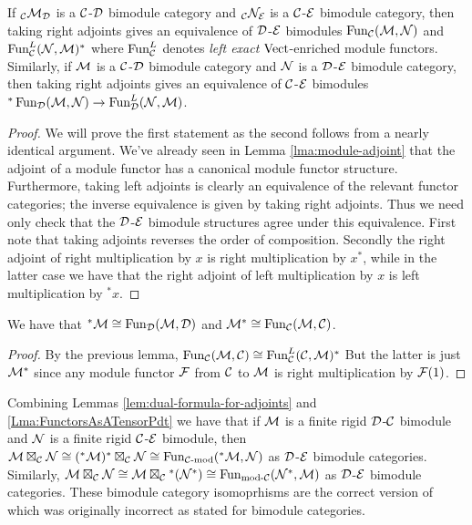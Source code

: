 \documentclass{amsart}
\begin{document}
\begin{lemma}
If ${}_{\mathcal C}\mathcal M_\mathcal D$ is a $\mathcal C$-$\mathcal D$ bimodule category and ${}_{\mathcal C}\mathcal N_\mathcal E$ is a $\mathcal C$-$\mathcal E$ bimodule category, then taking right adjoints gives an equivalence of $\mathcal D$-$\mathcal E$ bimodules $\operatorname{Fun}_{\mathcal C}(\mathcal M, \mathcal N)$ and $\operatorname{Fun}^L_{\mathcal C}(\mathcal N, \mathcal M)^*$ where $\operatorname{Fun}^L_\mathcal C$ denotes {\em left exact} $\mathrm{Vect}$-enriched module functors.  Similarly, if $\mathcal M$ is a $\mathcal C$-$\mathcal D$ bimodule category and $\mathcal N$ is a $\mathcal D$-$\mathcal E$ bimodule category, then taking right adjoints gives an equivalence of $\mathcal C$-$\mathcal E$ bimodules ${}^*\operatorname{Fun}_{\mathcal D}(\mathcal M, \mathcal N) \rightarrow \operatorname{Fun}^L_{\mathcal D}(\mathcal N, \mathcal M)$. 
\end{lemma}
\begin{proof}
	We will prove the first statement as the second follows from a nearly identical argument. 
We've already seen in Lemma \ref{lma:module-adjoint} that the adjoint of a module functor has a canonical module functor structure.  Furthermore, taking left adjoints is clearly an equivalence of the relevant functor categories; the inverse equivalence is given by taking right adjoints. Thus we need only check that the $\mathcal D$-$\mathcal E$ bimodule structures agree under this equivalence.  First note that taking adjoints reverses the order of composition. Secondly the right adjoint of right multiplication by $x$ is right multiplication by $x^*$, while in the latter case we have that the right adjoint of left multiplication by $x$ is left multiplication by ${}^*x$.
\end{proof}

\begin{lemma} \label{lem:dual-formula-for-adjoints}
We have that ${}^*\mathcal M \cong \operatorname{Fun}_{\mathcal D}(\mathcal M, \mathcal D)$ and $\mathcal M^* \cong \operatorname{Fun}_{\mathcal C}(\mathcal M, \mathcal C)$.
\end{lemma}
\begin{proof}
By the previous lemma, $\operatorname{Fun}_{\mathcal C}(\mathcal M, \mathcal C) \cong \operatorname{Fun}_{\mathcal C}^L(\mathcal C, \mathcal M)^*$  But the latter is just $\mathcal M^*$ since any module functor $\mathcal F$ from $\mathcal C$ to $\mathcal M$ is right multiplication by $\mathcal F(1)$.
\end{proof}

\begin{remark}
Combining Lemmas \ref{lem:dual-formula-for-adjoints} and \ref{Lma:FunctorsAsATensorPdt} we have that if $\mathcal M$ is a finite rigid $\mathcal D$-$\mathcal C$ bimodule and $\mathcal N$ is a finite rigid $\mathcal C$-$\mathcal E$ bimodule, then $\mathcal M \boxtimes_\mathcal C \mathcal N \cong ({}^*\mathcal M)^* \boxtimes_\mathcal C \mathcal N \cong \operatorname{Fun}_{\mathcal C\text{-mod}}({}^*\mathcal M,\mathcal N)$ as $\mathcal D$-$\mathcal E$ bimodule categories.   Similarly, $\mathcal M \boxtimes_{\mathcal C} \mathcal N \cong \mathcal M \boxtimes_\mathcal C {}^*(\mathcal N^*) \cong \operatorname{Fun}_{\text{mod-}\mathcal C}(\mathcal N^*,\mathcal M)$ as $\mathcal D$-$\mathcal E$ bimodule categories.  These bimodule category isomoprhisms are the correct version of \cite[Remark 3.6]{0909.3140} which was originally incorrect as stated for bimodule categories.
\end{remark}
\end{document}
